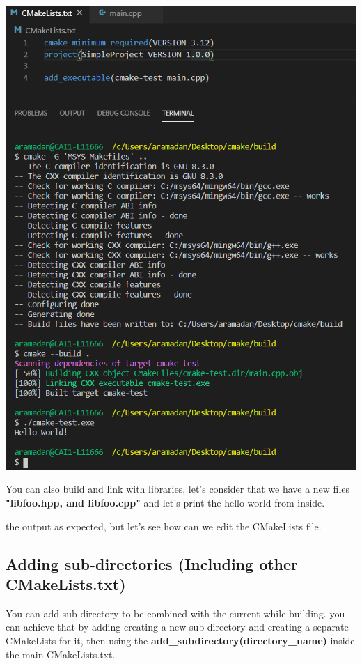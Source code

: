 \documentclass{article}
\begin{document}
\includegraphics[scale=0.75]{./resources/imgs/cmake/build-simple-cmake.PNG}

You can also build and link with libraries, let's consider that we have a new files \textbf{"libfoo.hpp, and libfoo.cpp"} and let's print the hello world from inside.


the output as expected, but let's see how can we edit the CMakeLists file.


\subsection{Adding sub-directories (Including other CMakeLists.txt)}
You can add sub-directory to be combined with the current while building. you can achieve that by adding creating a new sub-directory and creating a separate CMakeLists for it, then using the \textbf{add\_subdirectory(directory\_name)} inside the main CMakeLists.txt.
\end{document}
